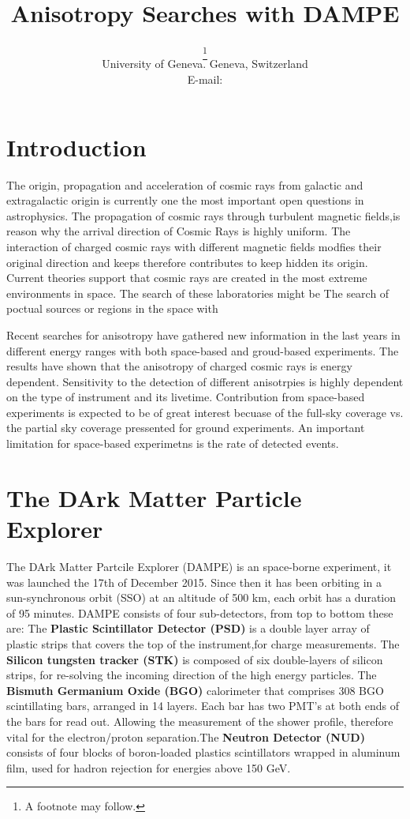\documentclass{PoS}
\title{Anisotropy Searches with DAMPE}
\author{\speaker{Maria Munoz}\thanks{A footnote may follow.}\\
        University of Geneva. Geneva, Switzerland\\
        E-mail: \email{maria.munoz@unige.ch}}
\begin{document}
\section{Introduction}

The origin, propagation and acceleration of  cosmic rays from galactic and extragalactic origin is currently one the most important open questions in astrophysics. The propagation of  cosmic rays through turbulent magnetic fields,is reason why the arrival direction of  Cosmic Rays is highly uniform. The interaction of charged cosmic rays with different magnetic fields modfies their original direction and keeps therefore contributes to keep hidden its origin. Current theories support that cosmic rays are created in the most extreme  environments in space. The search of these laboratories might be
The search of poctual sources or regions in the space with

Recent searches for anisotropy have gathered new information in the last years in different energy ranges with both space-based and groud-based experiments. The results have shown that the anisotropy of charged cosmic rays is energy dependent. Sensitivity to the detection of different anisotrpies is highly dependent on the type of instrument and its livetime. Contribution from space-based experiments is expected to be of great interest becuase of the full-sky coverage vs. the partial sky coverage pressented for ground experiments. An important limitation for space-based experimetns is the  rate of detected events.

\section{The DArk Matter Particle Explorer}

The DArk Matter Partcile Explorer (DAMPE) is an space-borne experiment, it was launched the 17th of December 2015.  Since then it has been orbiting in a sun-synchronous orbit (SSO) at an altitude of 500 km, each orbit has a duration of 95 minutes. DAMPE consists of four sub-detectors, from top to bottom these are:
The \textbf{Plastic Scintillator Detector (PSD)} is a double layer array of plastic strips that covers the top of the instrument,for charge measurements. The \textbf{Silicon tungsten tracker (STK)} is composed of six double-layers of silicon strips, for re-solving the incoming direction of the high energy particles. The \textbf{Bismuth Germanium Oxide (BGO)} calorimeter that comprises 308 BGO scintillating bars, arranged in 14 layers. Each bar has two PMT’s at both ends of the bars for read out. Allowing the measurement of the shower profile, therefore vital for the electron/proton separation.The \textbf{Neutron Detector (NUD)} consists of four blocks of boron-loaded plastics scintillators wrapped in aluminum film, used for hadron rejection for energies above 150 GeV.
\end{document}
